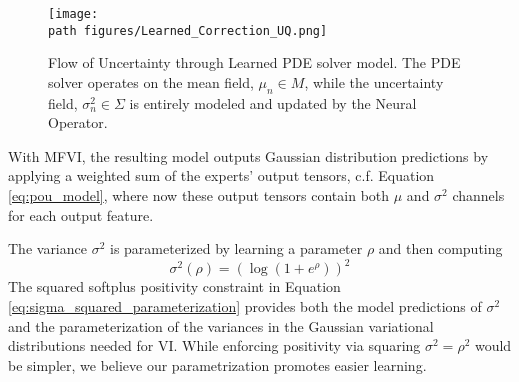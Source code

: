 \begin{figure}[htpb!]
    \centering
    \texttt{[image: \\path figures/Learned\_Correction\_UQ.png]}
    \caption{Flow of Uncertainty through Learned PDE solver model. The PDE solver operates on the mean field, $\mu_n \in M$, while the uncertainty field, $\sigma_n^2 \in \Sigma$ is entirely modeled and updated by the Neural Operator.}
    \label{fig:Learned_Correction_UQ}
\end{figure}

With MFVI, the resulting model outputs Gaussian distribution predictions by applying a weighted sum of the experts' output tensors, c.f. Equation \eqref{eq:pou_model}, where now these output tensors contain both \(\mu\) and \(\sigma^2\) channels for each output feature.

The variance $\sigma^2$ is parameterized by learning a parameter $\rho$ and then computing
\begin{equation}
    \sigma^2(\rho) = (\log(1 + e^{\rho}))^2
    \label{eq:sigma_squared_parameterization}
\end{equation}
The squared softplus positivity constraint in Equation \eqref{eq:sigma_squared_parameterization} provides both the model predictions of $\sigma^2$ and the parameterization of the variances in the Gaussian variational distributions needed for VI. While enforcing positivity via squaring \(\sigma^2=\rho^2\) would be simpler, we believe our parametrization promotes easier learning.
